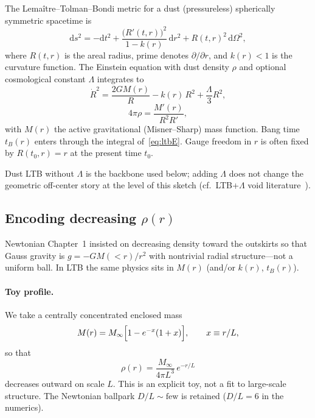 \documentclass[11pt,a4paper]{article}
\begin{document}
The Lema\^itre--Tolman--Bondi metric for a dust (pressureless) spherically
symmetric spacetime is~\citep{Lemaitre1933,Tolman1934,Bondi1947}
\begin{equation}
  \mathrm{d}s^2
  = -\mathrm{d}t^2
  + \frac{\bigl(R'(t,r)\bigr)^2}{1-k(r)}\,\mathrm{d}r^2
  + R(t,r)^2\,\mathrm{d}\Omega^2,
  \label{eq:ltb}
\end{equation}
where $R(t,r)$ is the areal radius, prime denotes $\partial/\partial r$, and
$k(r)<1$ is the curvature function. The Einstein equation with dust density
$\rho$ and optional cosmological constant $\Lambda$ integrates to
\begin{equation}
  \dot R^2
  = \frac{2GM(r)}{R} - k(r)\,R^2 + \frac{\Lambda}{3}R^2,
  \label{eq:ltbE}
\end{equation}
\begin{equation}
  4\pi\rho
  = \frac{M'(r)}{R^2 R'},
  \label{eq:ltbRho}
\end{equation}
with $M(r)$ the active gravitational (Misner--Sharp) mass function. Bang time
$t_B(r)$ enters through the integral of~\eqref{eq:ltbE}. Gauge freedom in $r$
is often fixed by $R(t_0,r)=r$ at the present time $t_0$.

Dust LTB without $\Lambda$ is the backbone used below; adding $\Lambda$ does
not change the geometric off-center story at the level of this sketch
(cf.\ LTB+$\Lambda$ void literature~\citep{Alnes2006,Blomqvist2010}).

\subsection{Encoding decreasing $\rho(r)$}

Newtonian Chapter~1 insisted on decreasing density toward the outskirts so that
Gauss gravity is $g=-GM(<r)/r^2$ with nontrivial radial structure---not a
uniform ball. In LTB the same physics sits in $M(r)$ (and/or $k(r)$, $t_B(r)$).

\paragraph{Toy profile.}
We take a centrally concentrated enclosed mass
\begin{equation}
  M(r)
  = M_\infty\Bigl[1-e^{-x}(1+x)\Bigr],
  \qquad x\equiv r/L,
  \label{eq:Mtoy}
\end{equation}
so that
\begin{equation}
  \rho(r)
  = \frac{M_\infty}{4\pi L^3}\,e^{-r/L}
  \label{eq:rhotoy}
\end{equation}
decreases outward on scale $L$. This is an explicit toy, not a fit to large-scale
structure. The Newtonian ballpark $D/L\sim\mathrm{few}$ is retained
($D/L=6$ in the numerics).
\end{document}
